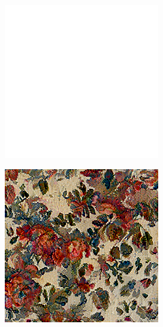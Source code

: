\begin{figure}[]
\begin{subfigure}{\textwidth}
\begin{subfigure}{0.24\textwidth}
            \includegraphics[width=\textwidth]{images/04-experiment01/flowers/white_bg.jpg}
            \caption*{}
        \end{subfigure}
        \hfill
        \begin{subfigure}{0.24\textwidth}
            \centering
            \includegraphics[width=\textwidth]{images/04-experiment01/flowers/1000/white_im.jpg}

\end{subfigure}
\end{subfigure}
\end{figure}
